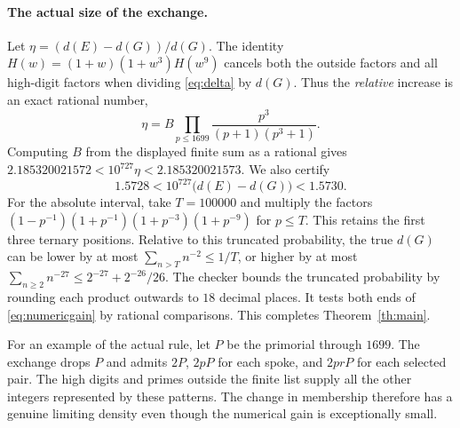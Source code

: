\paragraph{The actual size of the exchange.}
Let $\eta=(d(E)-d(G))/d(G)$. The identity
$H(w)=(1+w)(1+w^3)H(w^9)$ cancels both the outside factors and all high-digit factors when dividing \eqref{eq:delta} by $d(G)$. Thus the \emph{relative} increase is an exact rational number,
\[
 \eta=B\prod_{p\le1699}\frac{p^3}{(p+1)(p^3+1)} .
\]
Computing $B$ from the displayed finite sum as a rational gives
$2.185320021572<10^{727}\eta<2.185320021573$.
We also certify
\begin{equation}\label{eq:numericgain}
              1.5728 <10^{727}\bigl(d(E)-d(G)\bigr)< 1.5730 .
\end{equation}
For the absolute interval, take $T=100000$ and multiply the factors
$(1-p^{-1})(1+p^{-1})(1+p^{-3})(1+p^{-9})$ for $p\le T$.
This retains the first three ternary positions. Relative to this truncated probability, the true $d(G)$ can be lower by at most
$\sum_{n>T}n^{-2}\le1/T$, or higher by at most
$\sum_{n\ge2}n^{-27}\le 2^{-27}+2^{-26}/26$.
The checker bounds the truncated probability by rounding each product outwards to $18$ decimal places. It tests both ends of \eqref{eq:numericgain} by rational comparisons. This completes Theorem~\ref{th:main}.

For an example of the actual rule, let $P$ be the primorial through $1699$. The exchange drops $P$ and admits $2P$, $2pP$ for each spoke, and $2prP$ for each selected pair. The high digits and primes outside the finite list supply all the other integers represented by these patterns. The change in membership therefore has a genuine limiting density even though the numerical gain is exceptionally small.
